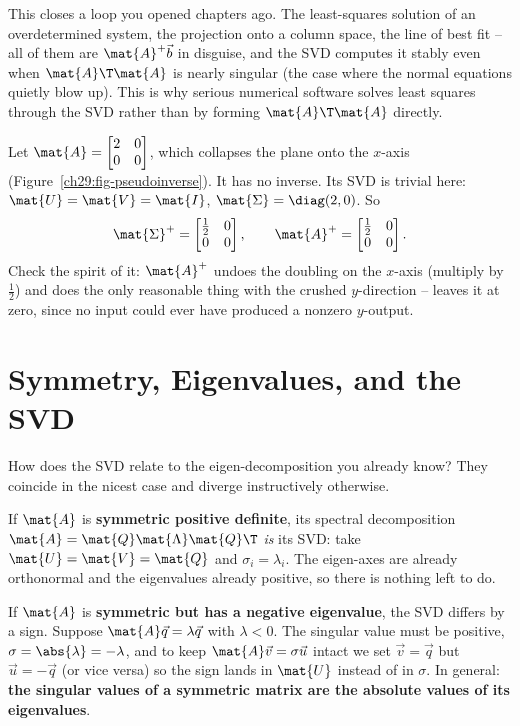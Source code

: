 This closes a loop you opened chapters ago. The least-squares solution of an
overdetermined system, the projection onto a column space, the line of best fit --
all of them are $\mat{A}^+\vec{b}$ in disguise, and the SVD computes it stably even
when $\mat{A}\T\mat{A}$ is nearly singular (the case where the normal equations
quietly blow up). This is why serious numerical software solves least squares
through the SVD rather than by forming $\mat{A}\T\mat{A}$ directly.

\begin{example}
\label{ch29:ex-pseudoinverse}
Let $\mat{A} = \begin{bmatrix} 2 & 0 \\ 0 & 0\end{bmatrix}$, which collapses the
plane onto the $x$-axis (Figure~\ref{ch29:fig-pseudoinverse}). It has no inverse.
Its SVD is trivial here:
$\mat{U} = \mat{V} = \mat{I}$, $\mat{\Sigma} = \diag(2,0)$. So
\[
  \mat{\Sigma}^+ = \begin{bmatrix} \tfrac12 & 0 \\ 0 & 0 \end{bmatrix},
  \qquad
  \mat{A}^+ = \begin{bmatrix} \tfrac12 & 0 \\ 0 & 0 \end{bmatrix}.
\]
Check the spirit of it: $\mat{A}^+$ undoes the doubling on the $x$-axis (multiply
by $\tfrac12$) and does the only reasonable thing with the crushed $y$-direction
-- leaves it at zero, since no input could ever have produced a nonzero
$y$-output.
\end{example}

\section{Symmetry, Eigenvalues, and the SVD}
\label{ch29:symmetric-link}

How does the SVD relate to the eigen-decomposition you already know? They coincide
in the nicest case and diverge instructively otherwise.

If $\mat{A}$ is \textbf{symmetric positive definite}, its spectral decomposition
$\mat{A} = \mat{Q}\mat{\Lambda}\mat{Q}\T$ \emph{is} its SVD: take $\mat{U} =
\mat{V} = \mat{Q}$ and $\sigma_i = \lambda_i$. The eigen-axes are already
orthonormal and the eigenvalues already positive, so there is nothing left to do.

If $\mat{A}$ is \textbf{symmetric but has a negative eigenvalue}, the SVD differs
by a sign. Suppose $\mat{A}\vec{q} = \lambda\vec{q}$ with $\lambda < 0$. The
singular value must be positive, $\sigma = \abs{\lambda} = -\lambda$, and to keep
$\mat{A}\vec{v} = \sigma\vec{u}$ intact we set $\vec{v} = \vec{q}$ but
$\vec{u} = -\vec{q}$ (or vice versa) so the sign lands in $\mat{U}$ instead of in
$\sigma$. In general: \textbf{the singular values of a symmetric matrix are the
absolute values of its eigenvalues}.

